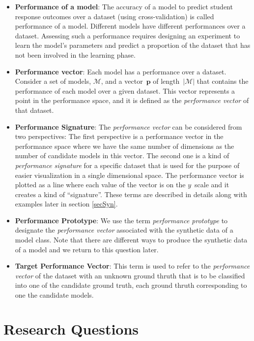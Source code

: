 \begin{itemize}
\item \textbf{Performance of a model}: The accuracy of a model to predict student response outcomes over a dataset (using cross-validation) is called performance of a model. Different models have different performances over a dataset. Assessing such a performance requires designing an experiment to learn the model's parameters and predict a proportion of the dataset that has not been involved in the learning phase.
\item \textbf{Performance vector}: Each model has a performance over a dataset. Consider a set of models, $\mathcal{M}$, and a vector~$\mathbf{p}$ of length~$|\mathcal{M}|$ that contains the performance of each model over a given dataset. This vector represents a point in the performance space, and it is defined as the \textit{performance vector} of that dataset.

\item \textbf{Performance Signature}: The \textit{performance vector} can be considered from two perspectives: The first perspective is a performance vector in the performance space where we have the same number of dimensions as the number of candidate models in this vector. The second one is a kind of \textit{performance signature} for a specific dataset that is used for the purpose of easier visualization in a single dimensional space. The performance vector is plotted as a line where each value of the vector is on the $y$~scale and it creates a kind of ``signature''. These terms are described in details along with examples later in section \ref{secSyn}.

\item \textbf{Performance Prototype}: We use the term \textit{performance prototype} to designate the \textit{performance vector} associated with the synthetic data of a model class. Note that there are different ways to produce the synthetic data of a model and we return to this question later.

\item \textbf{Target Performance Vector}: This term is used to refer to the \textit{performance vector} of the dataset with an unknown ground thruth that is to be classified into one of the candidate ground truth, each ground thruth corresponding to one the candidate models.


\end{itemize}

\section{Research Questions}
